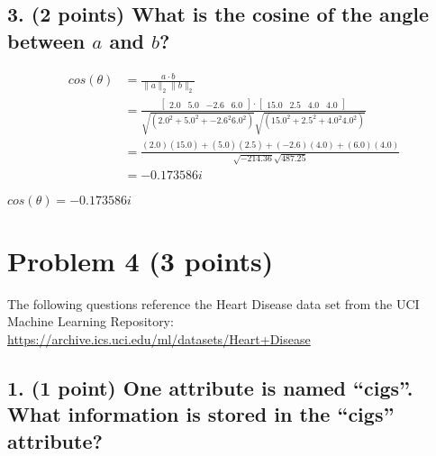 \documentclass[11pt]{article}
\begin{document}
\newpage
\subsection*{\textbf{3. (2 points)} What is the cosine of the angle between $a$ and $b$?}

\begin{align*}
    cos(\theta) &= \frac{ a \cdot b }{ \| a \|_2 \| b \|_2 }  \\
    &= \frac{ 
            \begin{bmatrix} 2.0  & 5.0 & -2.6 & 6.0 \end{bmatrix} \cdot \begin{bmatrix} 15.0 & 2.5 &  4.0 & 4.0 \end{bmatrix}
        }{
            \sqrt{ (2.0^2 + 5.0^2 + -2.6^2 6.0^2) } \sqrt{ (15.0^2 + 2.5^2 + 4.0^2 4.0^2) }
        } \\
    &=  \frac{ 
            (2.0)(15.0) + (5.0)(2.5) + (-2.6)(4.0) + (6.0)(4.0)
        }{
            \sqrt{ -214.36 } \sqrt{ 487.25 }
        } \\
    &= -0.173586 i
\end{align*}

\begin{tcolorbox}[title=Problem 3.2]
    $cos(\theta) = -0.173586 i$
\end{tcolorbox}

\newpage
\section*{Problem 4 (3 points)}

The following questions reference the Heart Disease data set from the UCI
Machine Learning Repository: \url{https://archive.ics.uci.edu/ml/datasets/Heart+Disease}

\subsection*{\textbf{1. (1 point)} One attribute is named ``cigs''.  What information is stored in the ``cigs'' attribute?}
\end{document}
